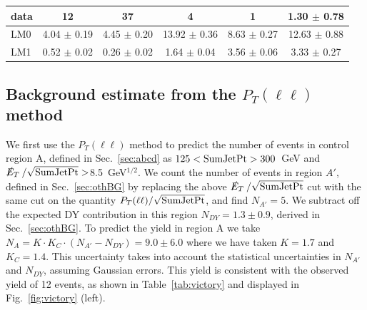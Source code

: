 \begin{table}[hbt]
\begin{center}
\begin{tabular}{l||c|c|c|c||c}
\hline
                data                     &                  12   &                  37   &                   4   &                   1   &   1.30  $\pm$  0.78  \\
\hline
                 LM0                     &   4.04  $\pm$  0.19   &   4.45  $\pm$  0.20   &  13.92  $\pm$  0.36   &   8.63  $\pm$  0.27   &  12.63  $\pm$  0.88  \\
                 LM1                     &   0.52  $\pm$  0.02   &   0.26  $\pm$  0.02   &   1.64  $\pm$  0.04   &   3.56  $\pm$  0.06   &   3.33  $\pm$  0.27  \\
\hline
\end{tabular}
\end{center}
\end{table}



\subsection{Background estimate from the $P_T(\ell\ell)$ method}
\label{sec:victoryres}

We first use the $P_T(\ell \ell)$ method to predict the number of events 
in control region A, defined in Sec.~\ref{sec:abcd} as 
$125<{\rm SumJetPt}>300$~GeV and $\met/\sqrt{\rm SumJetPt}>$8.5~GeV$^{1/2}$.
We count the number of events in region
$A'$, defined in Sec.~\ref{sec:othBG} by replacing the above $\met/\sqrt{\rm SumJetPt}$
cut with the same cut on the quantity $P_T(\ell\ell)/\sqrt{\rm SumJetPt}$,
and find $N_{A'}=5$. We subtract off the expected DY contribution in this region
$N_{DY} = 1.3 \pm 0.9$, derived in Sec.~\ref{sec:othBG}.
To predict the yield in region A we take 
$N_A = K \cdot K_C \cdot ( N_{A'} - N_{DY} ) = 9.0 \pm 6.0$
where we have taken $K = 1.7$ and $K_C = 1.4$.
This uncertainty takes into account the statistical uncertainties in $N_{A'}$ and $N_{DY}$,
assuming Gaussian errors. This yield is consistent
with the observed yield of 12 events, as shown in 
Table~\ref{tab:victory} and displayed in Fig.~\ref{fig:victory} (left).


